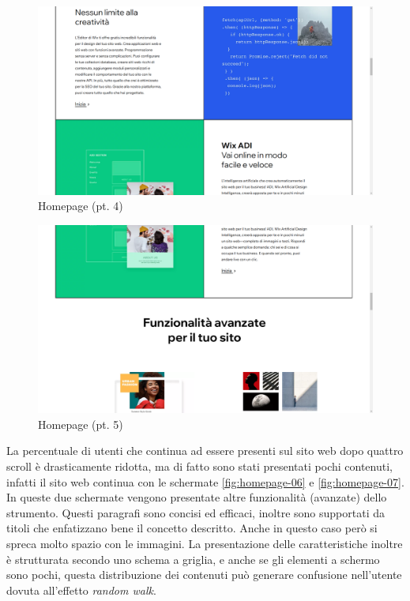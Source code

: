 \documentclass[11pt,a4paper]{article}
\begin{document}
\begin{figure}[H]
  \centering
  \includegraphics[width=1\textwidth]{img/homepage-04.png}
  \caption{Homepage (pt. 4)}
  \label{fig:homepage-04}
\end{figure}

\begin{figure}[H]
  \centering
  \includegraphics[width=1\textwidth]{img/homepage-05.png}
  \caption{Homepage (pt. 5)}
  \label{fig:homepage-05}
\end{figure}

La percentuale di utenti che continua ad essere presenti sul sito web
dopo quattro scroll è drasticamente ridotta, ma di fatto sono stati
presentati pochi contenuti, infatti il sito web continua con le
schermate \ref{fig:homepage-06} e \ref{fig:homepage-07}. In queste due
schermate vengono presentate altre funzionalità (avanzate) dello
strumento. Questi paragrafi sono concisi ed efficaci, inoltre sono
supportati da titoli che enfatizzano bene il concetto descritto. Anche
in questo caso però si spreca molto spazio con le immagini. La
presentazione delle caratteristiche inoltre è strutturata secondo uno
schema a griglia, e anche se gli elementi a schermo sono pochi, questa
distribuzione dei contenuti può generare confusione nell'utente dovuta
all'effetto \textit{random walk}.
\end{document}

